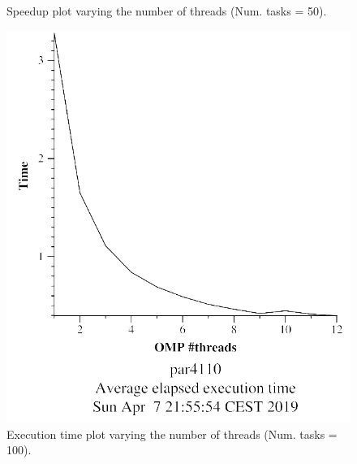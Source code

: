 \documentclass[12pt, a4paper]{article}
\begin{document}
\begin{figure}[H]
\begin{minipage}[b]{0.4\linewidth}
  \caption{Speedup plot varying the number of threads (Num. tasks = 50).}
  \label{fig:mandel-omp-10000-strong-omp-24-50-speedup}
\end{minipage}
\end{figure}

\begin{figure}[H]
\centering
\begin{minipage}[b]{0.4\linewidth}
  \centering
  \includegraphics[scale=0.5]{./mandel-omp-10000-strong-omp-24-100-time}
  \caption{Execution time plot varying the number of threads (Num. tasks = 100).}
  \label{fig:mandel-omp-10000-strong-omp-24-100-time}
\end{minipage}%
\hspace{0.5cm}
\begin{minipage}[b]{0.4\linewidth}
  \centering

\end{minipage}
\end{figure}
\end{document}
